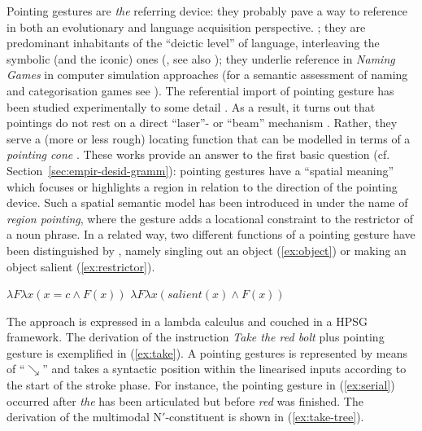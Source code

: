 \documentclass[output=paper]{langsci/langscibook}
\begin{document}
 
Pointing gestures are \emph{the} referring device:
%
they probably pave a way to reference in both an evolutionary and language acquisition perspective. \citep{Bruner:1998,Masataka:2003,Matthews:Behne:Lieven:Tomasello:2012};
%
they are predominant inhabitants of the \enquote{deictic level} of language, interleaving the symbolic (and the iconic) ones (\citet{Levinson:2008}, see also \citet{Buehler:1934:ORIG});
%
they underlie reference in \textit{Naming Games} in computer simulation approaches \citep{Steels:1995} (for a semantic assessment of naming and categorisation games see \citet{Luecking:Mehler:2012}).  
%
The referential import of pointing gesture has been studied experimentally to some detail \citep{Bangerter:Oppenheimer:2006,Kranstedt:Luecking:Pfeiffer:Rieser:Wachsmuth:2006:a,Kranstedt:Luecking:Pfeiffer:Rieser:Wachsmuth:2006:b,van:der:Sluis:Krahmer:2007}. 
%
As a result, it turns out that pointings do not rest on a direct \enquote{laser}- or \enquote{beam} mechanism \citep{McGinn:1981}.
%
Rather, they serve a (more or less rough) locating function \citep{Clark:1996} that can be modelled in terms of a \emph{pointing cone} \citep{Luecking:Pfeiffer:Rieser:2015}. 
%
These works provide an answer to the first basic question (cf. Section~\ref{sec:empir-desid-gramm}): pointing gestures have a \enquote{spatial meaning} which focuses or highlights a region in relation to the direction of the pointing device.
%
Such a spatial semantic model has been introduced in \citet{Rieser:2004} under the name of \emph{region pointing}, where the gesture adds a locational constraint to the restrictor of a noun phrase.
%
In a related way, two different functions of a pointing gesture have been distinguished by \citet{Kuehnlein:Nimke:Stegmann:2002}, namely singling out an object (\ref{ex:object}) or making an object salient (\ref{ex:restrictor}).
%


\ea \label{ex:pointing-functions}
\ea \label{ex:object}
$\lambda F \lambda x (x = c \wedge F(x))$
\z
\ea \label{ex:restrictor}
$\lambda F \lambda x (\textit{salient}(x) \wedge F(x))$
\z 
\z

The approach is expressed in a lambda calculus and couched in a HPSG framework.
%
The derivation of the instruction \textit{Take the red bolt} plus pointing gesture is exemplified in (\ref{ex:take}).
%
A pointing gestures is represented by means of \enquote{$\searrow$} and takes a syntactic position within the linearised inputs according to the start of the stroke phase. 
%
For instance, the pointing gesture in (\ref{ex:serial}) occurred after \textit{the} has been articulated but before \textit{red} was finished.
%
The derivation of the multimodal N$'$-constituent is shown in (\ref{ex:take-tree}).
\end{document}
